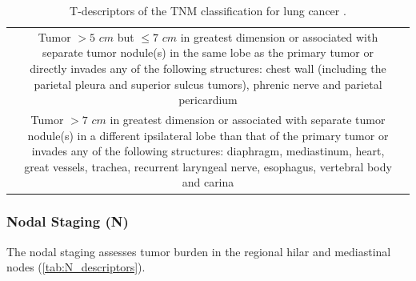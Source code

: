 \begin{table}[ht]
{\begin{tabular}{lcp{18cm}}
\rowcolor[HTML]{FFFFFF} 
    \multicolumn{2}{l}{\cellcolor[HTML]{FFFFFF}\textbf{T3}} & Tumor $> 5$ $cm$ but $\le 7$ $cm$ in greatest dimension or associated with separate tumor nodule(s) in the same lobe as the primary tumor or directly invades any of the following structures: chest wall (including the parietal pleura and superior sulcus tumors), phrenic nerve and parietal pericardium \\
\rowcolor[HTML]{EFEFEF}
    \multicolumn{2}{l}{\cellcolor[HTML]{EFEFEF}\textbf{T4}} & Tumor $> 7$ $cm$ in greatest dimension or associated with separate tumor nodule(s) in a different ipsilateral lobe than that of the primary tumor or invades any of the following structures: diaphragm, mediastinum, heart, great vessels, trachea, recurrent laryngeal nerve, esophagus, vertebral body and carina
\end{tabular}}
\caption{T-descriptors of the TNM classification for lung cancer \cite{TNM_proposal}.}
\label{tab:T_descriptors}
\end{table}

\subsubsection{Nodal Staging (N)}

The nodal staging assesses tumor burden in the regional hilar and mediastinal nodes (\autoref{tab:N_descriptors}).

\begin{table}[ht]
\centering
{}
\caption{N-descriptors of the TNM classification for lung cancer \cite{TNM_proposal}.}
\label{tab:N_descriptors}
\end{table}

